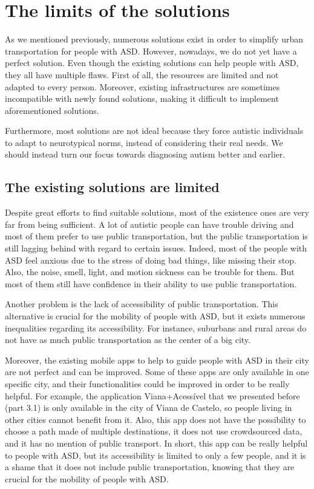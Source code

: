 \section{The limits of the solutions}

As we mentioned previously, numerous solutions exist in order to simplify urban transportation for people with ASD. However, nowadays, we do not yet have a perfect solution. Even though the existing solutions can help people with ASD, they all have multiple flaws. First of all, the resources are limited and not adapted to every person. Moreover, existing infrastructures are sometimes incompatible with newly found solutions, making it difficult to implement aforementioned solutions.

Furthermore, most solutions are not ideal because they force autistic individuals to adapt to neurotypical norms, instead of considering their real needs. We should instead turn our focus towards diagnosing autism better and earlier.

\subsection{The existing solutions are limited}

Despite great efforts to find suitable solutions, most of the existence ones are very far from being sufficient. A lot of autistic people can have trouble driving and most of them prefer to use public transportation\cite{2015ViewpointsAdultsAutism}\cite{2020DevelopingCommunityMobility}, but the public transportation is still lagging behind with regard to certain issues. Indeed, most of the people with ASD feel anxious due to the stress of doing bad things, like missing their stop. Also, the noise, smell, light, and motion sickness can be trouble for them. But most of them still have confidence in their ability to use public transportation\cite{2020ExperiencesYoungAutistic}.

Another problem  is the lack of accessibility of public transportation. This alternative is crucial for the mobility of people with ASD, but it exists numerous inequalities regarding its accessibility. For instance, suburbans and rural areas do not have as much public transportation as the center of a big city\cite{2015DetourRightPlace}.

Moreover, the existing mobile apps to help to guide people with ASD in their city are not perfect and can be improved. Some of these apps are only available in one specific city, and their functionalities could be improved in order to be really helpful. For example, the application Viana+Acessível that we presented before (part 3.1) is only available in the city of Viana de Castelo, so people living in other cities cannot benefit from it. Also, this app does not have the possibility to choose a path made of multiple destinations, it does not use crowdsourced data, and it has no mention of public transport. In short, this app can be really helpful to people with ASD, but its accessibility is limited to only a few people, and it is a shame that it does not include public transportation, knowing that they are crucial for the mobility of people with ASD\cite{2023AccessibilityStrategiesPromote}.

